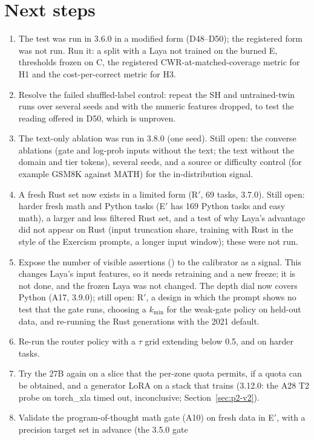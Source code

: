 \documentclass[11pt,a4paper]{article}
\newcommand{\code}[1]{\texttt{\detokenize{#1}}}
\begin{document}
\section{Next steps}
\begin{enumerate}
\item The test was run in 3.6.0 in a modified form (D48--D50); the registered form was not run. Run it: a split with a Laya not trained on the burned E, thresholds frozen on C, the registered CWR-at-matched-coverage metric for H1 and the cost-per-correct metric for H3.
\item Resolve the failed shuffled-label control: repeat the SH and untrained-twin runs over several seeds and with the numeric features dropped, to test the reading offered in D50, which is unproven.
\item The text-only ablation was run in 3.8.0 (one seed). Still open: the converse ablations (gate and log-prob inputs without the text; the text without the domain and tier tokens), several seeds, and a source or difficulty control (for example GSM8K against MATH) for the in-distribution signal.
\item A fresh Rust set now exists in a limited form (R$'$, 69 tasks, 3.7.0). Still open: harder fresh math and Python tasks (E$'$ has 169 Python tasks and easy math), a larger and less filtered Rust set, and a test of why Laya's advantage did not appear on Rust (input truncation share, training with Rust in the style of the Exercism prompts, a longer input window); these were not run.
\item Expose the number of visible assertions (\code{tests\_total}) to the calibrator as a signal. This changes Laya's input features, so it needs retraining and a new freeze; it is not done, and the frozen Laya was not changed. The depth dial now covers Python (A17, 3.9.0); still open: R$'$, a design in which the prompt shows no test that the gate runs, choosing a $k_{\min}$ for the weak-gate policy on held-out data, and re-running the Rust generations with the 2021 default.
\item Re-run the router policy with a $\tau$ grid extending below 0.5, and on harder tasks.
\item Try the 27B again on a slice that the per-zone quota permits, if a quota can be obtained, and a generator LoRA on a stack that trains (3.12.0: the A28 T2 probe on torch\_xla timed out, inconclusive; Section~\ref{sec:p2-v2}).
\item Validate the program-of-thought math gate (A10) on fresh data in E$'$, with a precision target set in advance (the 3.5.0 gate

\end{enumerate}
\end{document}
